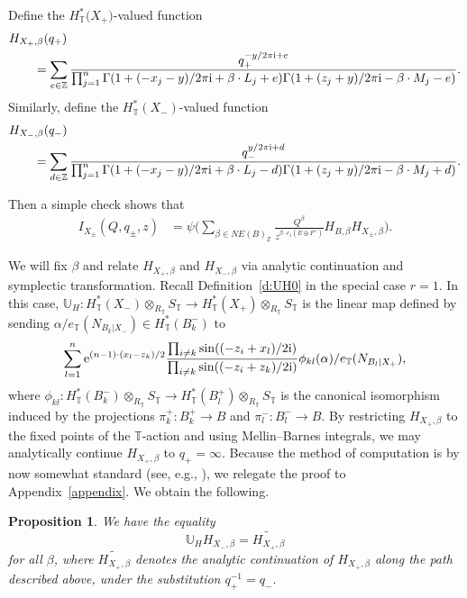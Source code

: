 \documentclass[pdftex]{sigma}
\newtheorem{Proposition}[Theorem]{Proposition}
 { \theoremstyle{definition}
\newtheorem{Definition}[Theorem]{Definition}
\newtheorem{Note}[Theorem]{Note}
\newtheorem{Example}[Theorem]{Example}
\newtheorem{Remark}[Theorem]{Remark} }
\numberwithin{equation}{section}
\newcommand{\ZZ}{\mathbb{Z}}
\newcommand{\UU}{\mathbb{U}}
\newcommand{\torus}{\mathbb{T}}
\newcommand{\F}{F}
\newcommand{\E}{E}
\newcommand{\MB}{M}
\newcommand{\LB}{L}
\newcommand{\z}{z}
\newcommand{\x}{x}
\newcommand{\y}{y}
\begin{document}
Define the $H^*_\torus\bigl(X_+\bigr)$-valued function
\begin{align*}&H_{X_{+}, \beta}(q_+)\\ \nonumber
&\qquad{}= \sum_{e \in \ZZ} \frac{q_+^{-y/2 \pi {\rm i}+e}}
{\prod_{j=1}^n \Gamma(1 + (- \x_j - \y)/2 \pi {\rm i} + \beta \cdot \LB_j+e) \Gamma(1 + (\z_j + \y)/2 \pi {\rm i} - \beta \cdot \MB_j - e)}.\end{align*}
Similarly, define the $H^*_\torus(X_-)$-valued function
\begin{align}\label{e:HXm} &H_{X_-, \beta}(q_-) \\ \nonumber
& \qquad{}= \sum_{d \in \ZZ} \frac{q_-^{y/2 \pi {\rm i}+d}}
{\prod_{j=1}^n \Gamma(1 + (- \x_j - \y)/2 \pi {\rm i} + \beta \cdot \LB_j-d) \Gamma(1 + (\z_j + \y)/2 \pi {\rm i} - \beta \cdot \MB_j + d)}.\end{align}

Then a simple check shows that
\begin{align}\label{ItoH} I_{X_\pm}(Q, q_\pm, z) &{}= \psi \biggl( \sum_{\beta \in NE(B)_\ZZ} \frac{Q^\beta}{z^{\beta \cdot c_1(\E \oplus \F^\vee)}} H_{B, \beta} H_{X_\pm, \beta} \biggr).
\end{align}



We will fix $\beta$ and relate $H_{X_+, \beta}$ and $H_{X_-, \beta}$ via analytic continuation and symplectic transformation.
Recall Definition~\ref{d:UH0} in the special case $r=1$. In this case, $\UU_H\colon H^*_\torus(X_{-}) \otimes_{R_\torus} S_\torus \to H^*_\torus(X_{+})\otimes_{R_\torus} S_\torus$ is the linear map defined
by sending
$\alpha/e_\torus(N_{B_k|X_-}) \in H^*_\torus(B_k^{-})$ to
\begin{equation}\label{eU1}
\sum_{l = 1}^n {\rm e}^{ (n-1)\cdot ( \x_l-\z_k)/2 }\frac{ \prod_{i\neq k} \sin( (-\z_i+\x_l)/2 {\rm i}) }{\prod_{i \neq k}\sin((-\z_i + \z_k)/2 {\rm i})} \phi_{kl}(\alpha)/e_\torus(N_{B_l|X_+}),\end{equation}
where $\phi_{kl}\colon H^*_\torus(B_k^{-})\otimes_{R_\torus} S_\torus \to H^*_\torus(B_l^{+})\otimes_{R_\torus} S_\torus$ is the canonical isomorphism induced by the projections $\pi_k^{+}\colon B_k^{+} \to B$ and $\pi_l^{-}\colon B_l^{-} \to B$.
By restricting $H_{X_+, \beta}$ to the fixed points of the $\torus$-action and
using Mellin--Barnes integrals, we may analytically continue $H_{X_+, \beta}$ to $q_+ = \infty.$ Because the method of computation is by now somewhat standard (see, e.g., \cite{CIJ}), we relegate the proof to Appendix~\ref{appendix}.
We obtain the following.
\begin{Proposition}\label{p:ac1}
We have the equality
 \begin{equation}\label{analyticcomp}
\UU_H H_{X_{-}, \beta} = \widetilde{H_{X_{+}, \beta}}
\end{equation}
for all $\beta$, where $\widetilde{H_{X_{+}, \beta}}$ denotes the analytic continuation of $H_{X_{+}, \beta}$ along the path described above, under the substitution $q_+^{-1} = q_-$.
\end{Proposition}
\end{document}
